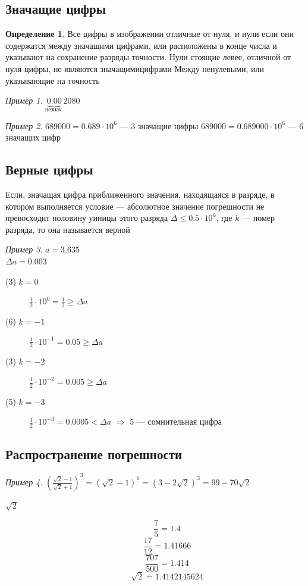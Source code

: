 \documentclass[oneside]{book}
\theoremstyle{plain}
\theoremstyle{remark}
\newtheorem*{examp}{Пример}
\theoremstyle{definition}
\newtheorem*{definition}{Определение}
\begin{document}
\subsection{Значащие цифры}
\label{sec:org67b80cc}
\begin{definition}
Все цифры в изображении отличные от нуля, и нули если они содержатся
между значащими цифрами, или расположены в конце числа и указывают на
сохранение разряды точности.  Нули стоящие левее, отличной от нуля
цифры, не являются значащимицифрами Между ненулевыми, или указывающие
на точность
\end{definition}

\begin{examp}
\(\underbrace{0.00}_\text{незнач.}2080\)
\end{examp}
\begin{examp}
\(689000 = 0.689 \cdot 10^6\) --- 3 значащие цифры
\(689000 = 0.689000 \cdot 10^6\) --- 6 значащих цифр
\end{examp}

\subsection{Верные цифры}
\label{sec:org2ad3fdb}
\begin{defintion}
Если, значащая цифра приближенного значения, находящаяся в разряде, в
котором выполняется условие --- абсолютное значение погрешности не
превосходит половину уиницы этого разряда \(\Delta \le 0.5\cdot 10^k\),
где \(k\) --- номер разряда, то она называется верной
\end{defintion}

\begin{examp}
\(a = 3.635\) \\
\(\Delta a = 0.003\) \\
\begin{description}
\item[{(3) \(k = 0\)}] \(\frac{1}{2} \cdot 10^0 = \frac{1}{2} \ge \Delta a\)
\item[{(6) \(k = -1\)}] \(\frac{1}{2} \cdot 10^{-1} = 0.05 \ge \Delta a\)
\item[{(3) \(k = -2\)}] \(\frac{1}{2} \cdot 10^{-2} = 0.005 \ge \Delta a\)
\item[{(5) \(k = -3\)}] \(\frac{1}{2} \cdot 10^{-3} = 0.0005 < \Delta a\) \(\Rightarrow\) 5 --- сомнительная цифра
\end{description}
\end{examp}

\subsection{Распространение погрешности}
\label{sec:org7fd75dc}
\begin{examp}
\(\left(\frac{\sqrt{2} - 1}{\sqrt{2} + 1}\right)^3 = (\sqrt{2} - 1)^6 = (3 - 2\sqrt{2})^3 = 99 - 70\sqrt{2}\) \\
\begin{description}
\item[{\(\sqrt{2}\)}] \[ \frac{7}{5} = 1.4 \]
\[ \frac{17}{12} = 1.41666 \]
\[ \frac{707}{500} = 1.414 \]
\[ \sqrt{2} = 1.4142145624 \]
\end{description}
\end{examp}
\end{document}

